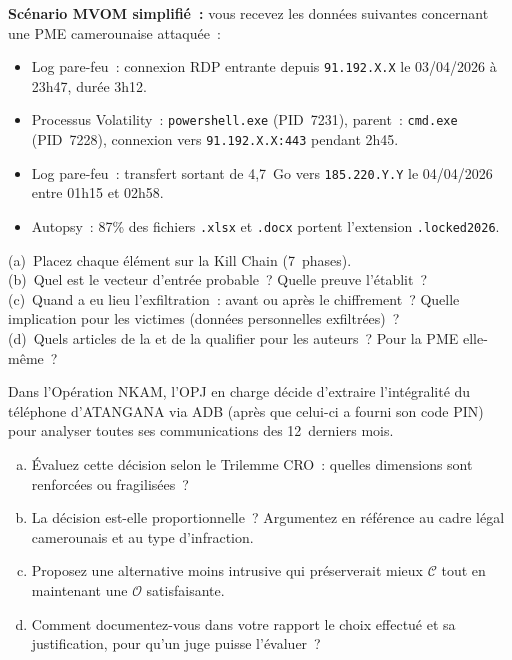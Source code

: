 \begin{boxexo}[title={\ding{45}\quad Exercice~3.2. Reconstitution d'attaque \niveaumoyen}]
\textbf{Scénario MVOM simplifié~:} vous recevez les données suivantes
concernant une PME camerounaise attaquée~:

\begin{itemize}
    \item Log pare-feu~: connexion RDP entrante depuis \texttt{91.192.X.X}
          le 03/04/2026 à 23h47, durée 3h12.
    \item Processus Volatility~: \texttt{powershell.exe} (PID~7231),
          parent~: \texttt{cmd.exe} (PID~7228), connexion vers
          \texttt{91.192.X.X:443} pendant 2h45.
    \item Log pare-feu~: transfert sortant de 4,7~Go vers \texttt{185.220.Y.Y}
          le 04/04/2026 entre 01h15 et 02h58.
    \item Autopsy~: 87\% des fichiers \texttt{.xlsx} et \texttt{.docx}
          portent l'extension \texttt{.locked2026}.

\end{itemize}

(a)~Placez chaque élément sur la Kill Chain (7~phases).\\
(b)~Quel est le vecteur d'entrée probable~? Quelle preuve l'établit~?\\
(c)~Quand a eu lieu l'exfiltration~: avant ou après le chiffrement~?
Quelle implication pour les victimes (données personnelles exfiltrées)~?\\
(d)~Quels articles de la  et de la 
qualifier pour les auteurs~? Pour la PME elle-même~?
\end{boxexo}

\begin{boxexo}[title={\ding{45}\quad Exercice~3.3. Analyse CRO d'une décision
investigative \niveauexpert}]
Dans l'Opération NKAM, l'OPJ en charge décide d'extraire l'intégralité
du téléphone d'ATANGANA via ADB (après que celui-ci a fourni son code PIN)
pour analyser toutes ses communications des 12~derniers mois.

\begin{enumerate}[(a)]
    \item Évaluez cette décision selon le Trilemme CRO~: quelles
          dimensions sont renforcées ou fragilisées~?
    \item La décision est-elle proportionnelle~? Argumentez en référence
          au cadre légal camerounais et au type d'infraction.
    \item Proposez une alternative moins intrusive qui préserverait mieux
          $\mathcal{C}$ tout en maintenant une $\mathcal{O}$ satisfaisante.
    \item Comment documentez-vous dans votre rapport le choix effectué
          et sa justification, pour qu'un juge puisse l'évaluer~?
\end{enumerate}
\end{boxexo}

